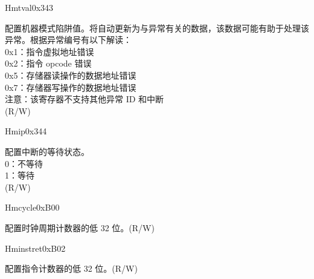 \begin{register}{H}{mtval}{0x343}\label{regdesc:LPMTVAL}
%
\regnewline%
\begin{regdesc}\begin{reglist}
\label{fielddesc:LPMTVAL}\item [MTVAL] 配置机器模式陷阱值。将自动更新为与异常有关的数据，该数据可能有助于处理该异常。根据异常编号有以下解读：\\
0x1：指令虚拟地址错误\\
0x2：指令 opcode 错误\\
0x5：存储器读操作的数据地址错误\\
0x7：存储器写操作的数据地址错误\\
注意：该寄存器不支持其他异常 ID 和中断\\
(R/W)
\end{reglist}\end{regdesc}
\end{register}


\begin{register}{H}{mip}{0x344}\label{regdesc:LPMIP}
%
%
%
\regnewline%
\begin{regdesc}\begin{reglist}
\label{fielddesc:LPMIPSIP}\item [IP] 配置中断的等待状态。\\
0：不等待\\
1：等待\\
(R/W)
\end{reglist}\end{regdesc}
\end{register}

\begin{register}{H}{mcycle}{0xB00}\label{regdesc:LPMCYCLE}
%
\regnewline%
\begin{regdesc}\begin{reglist}
\label{fielddesc:LPMCYCLE}\item [MCYCLE] 配置时钟周期计数器的低 32 位。(R/W)
\end{reglist}\end{regdesc}
\end{register}

\begin{register}{H}{minstret}{0xB02}\label{regdesc:LPMINSTRET}
%
\regnewline%
\begin{regdesc}\begin{reglist}
\label{fielddesc:LPMINSTRET}\item [MINSTRET] 配置指令计数器的低 32 位。(R/W)
\end{reglist}\end{regdesc}
\end{register}


